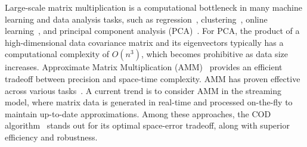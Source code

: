 Large-scale matrix multiplication is a computational bottleneck in many machine learning and data analysis tasks, such as regression~\cite{woodruff2014sketching,naseem2010linear}, clustering~\cite{cohen2015dimensionality,dhillon2001co}, online learning~\cite{TPAMI2022Wan,luo2019robust,duchi2011adaptive,agarwal2019efficient}, and principal component analysis (PCA)~\cite{abdi2010principal,hasan2021review,greenacre2022principal}. For PCA, the product of a high-dimensional data covariance matrix and its eigenvectors typically has a computational complexity of $O(n^3)$, which becomes prohibitive as data size increases. Approximate Matrix Multiplication (AMM)~\cite{drineas2006fast,woodruff2014sketching,ye2016frequent,mroueh2017co} provides an efficient tradeoff between precision and space-time complexity. AMM has proven effective across various tasks~\cite{cohen1999approximating,kyrillidis2014approximate,ye2016frequent,gupta2018oversketch,plancher2019application}. A current trend is to consider AMM in the streaming model, where matrix data is generated in real-time and processed on-the-fly to maintain up-to-date approximations. Among these approaches, the COD algorithm~\cite{mroueh2017co} stands out for its optimal space-error tradeoff, along with superior efficiency and robustness.


